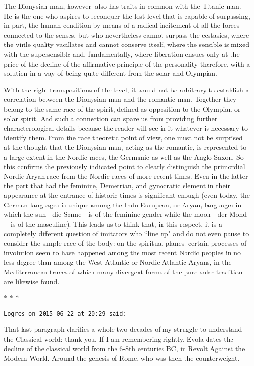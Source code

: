 The Dionysian man, however, also has traits in common with the Titanic man. He is the one who aspires to reconquer the lost level that is capable of surpassing, in part, the human condition by means of a radical incitement of all the forces connected to the senses, but who nevertheless cannot surpass the ecstasies, where the virile quality vacillates and cannot conserve itself, where the sensible is mixed with the supersensible and, fundamentally, where liberation ensues only at the price of the decline of the affirmative principle of the personality therefore, with a solution in a way of being quite different from the solar and Olympian.

With the right transpositions of the level, it would not be arbitrary to establish a correlation between the Dionysian man and the romantic man. Together they belong to the same race of the spirit, defined as opposition to the Olympian or solar spirit. And such a connection can spare us from providing further characterological details because the reader will see in it whatever is necessary to identify them. From the race theoretic point of view, one must not be surprised at the thought that the Dionysian man, acting as the romantic, is represented to a large extent in the Nordic races, the Germanic as well as the Anglo-Saxon. So this confirms the previously indicated point to clearly distinguish the primordial Nordic-Aryan race from the Nordic races of more recent times. Even in the latter the part that had the feminine, Demetrian, and gynocratic element in their appearance at the entrance of historic times is significant enough (even today, the German languages is unique among the Indo-European, or Aryan, languages in which the sun—die Sonne—is of the feminine gender while the moon—der Mond—is of the masculine). This leads us to think that, in this respect, it is a completely different question of imitators who ``line up" and do not even pause to consider the simple race of the body: on the spiritual planes, certain processes of involution seem to have happened among the most recent Nordic peoples in no less degree than among the West Atlantic or Nordic-Atlantic Aryans, in the Mediterranean traces of which many divergent forms of the pure solar tradition are likewise found.




\begin{center}* * *\end{center}

\begin{footnotesize}\begin{sffamily}



\texttt{Logres on 2015-06-22 at 20:29 said: }

That last paragraph clarifies a whole two decades of my struggle to understand the Classical world: thank you. If I am remembering rightly, Evola dates the decline of the classical world from the 6-8th centuries BC, in Revolt Against the Modern World. Around the genesis of Rome, who was then the counterweight.


\end{sffamily}\end{footnotesize}
